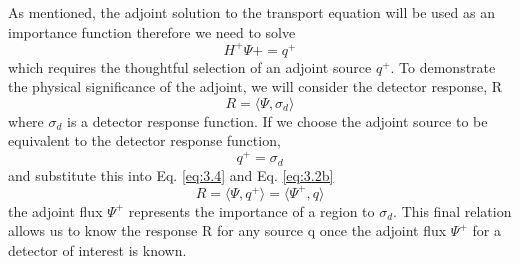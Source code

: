 As mentioned, the adjoint solution to the transport
equation will be used as an importance function therefore we need to solve
\begin{equation} \label{eq:3.3}
		H^{+}\Psi{+} = q^{+}
\end{equation}
which requires the thoughtful selection of an adjoint source $q^{+}$.
To demonstrate the physical significance of the adjoint, we will consider the
detector response, R
\begin{equation} \label{eq:3.4}
		R = \langle \Psi, \sigma_{d}\rangle 
\end{equation}
where $\sigma_{d}$ is a detector response function.
If we choose the adjoint source to be equivalent to the detector response
function,
\begin{equation} \label{eq:3.5}
		q^{+} = \sigma_{d}
\end{equation}
and substitute this into Eq. \ref{eq:3.4} and Eq. \ref{eq:3.2b} 
\begin{equation}
		R = \langle \Psi, q^{+} \rangle = \langle \Psi^{+}, q \rangle
\end{equation}
the adjoint flux $\Psi^{+}$ represents the importance of a region to
$\sigma_{d}$.
This final relation allows us to know the response R for any source q once the
adjoint flux $\Psi^{+}$ for a detector of interest is known.

